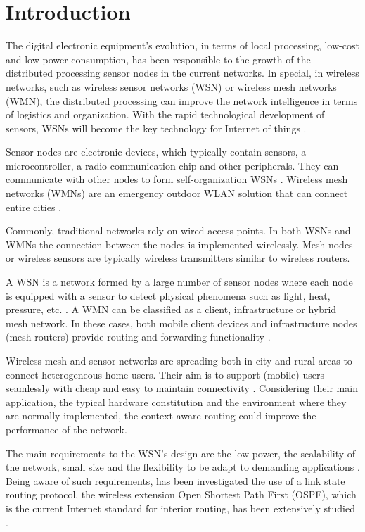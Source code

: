
\section{Introduction}
The digital electronic equipment’s evolution, in terms of local processing, low-cost and low power consumption, has been responsible to the growth of the distributed processing sensor nodes in the current networks. In special, in wireless networks, such as wireless sensor networks (WSN) or wireless mesh networks (WMN), the distributed processing can improve the network intelligence in terms of logistics and organization. With the rapid technological development of sensors, WSNs will become the key technology for Internet of things \cite{IEC2014}.

Sensor nodes are electronic devices, which typically contain sensors, a microcontroller, a radio communication chip and other peripherals. They can communicate with other nodes to form self-organization WSNs \cite{Son2009}. Wireless mesh networks (WMNs) are an emergency outdoor WLAN solution that can connect entire cities \cite{Akyildiz2009}.

Commonly, traditional networks rely on wired access points. In both WSNs and WMNs the connection between the nodes is implemented wirelessly. Mesh nodes or wireless sensors are typically wireless transmitters similar to wireless routers.

A WSN is a network formed by a large number of sensor nodes where each node is equipped with a sensor to detect physical phenomena such as light, heat, pressure, etc. \cite{IEC2014}. A WMN can be classified as a client, infrastructure or hybrid mesh network. In these cases, both mobile client devices and infrastructure nodes (mesh routers) provide routing and forwarding functionality \cite{Piezhao2008}.

Wireless mesh and sensor networks are spreading both in city and rural areas to connect heterogeneous home users. Their aim is to support (mobile) users seamlessly with cheap and easy to maintain connectivity \cite{Matos2013, Bhagwat2003, Johnson2007}. Considering their main application, the typical hardware constitution and the environment where they are normally implemented, the context-aware routing could improve the performance of the network.

The main requirements to the WSN's design are the low power, the scalability of the network, small size and the flexibility to be adapt to demanding applications \cite{Leon2015}. Being aware of such requirements, has been investigated the use of a link state routing protocol, the wireless extension Open Shortest Path First (OSPF), which is the current Internet standard for interior routing, has been extensively studied \cite{Holter2010, Fuertes2012}.

